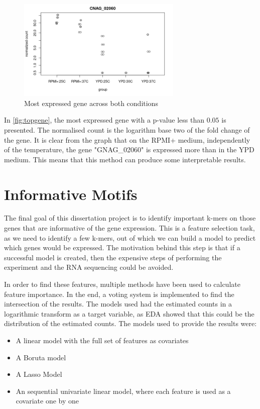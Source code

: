 \documentclass[11pt,twoside]{article}
\numberwithin{Theorem}{section}
\numberwithin{Definition}{section}
\numberwithin{Lemma}{section}
\numberwithin{Algorithm}{section}
\numberwithin{equation}{section}
\begin{document}
\vspace*{1em}
\begin{figure}[!h]
\centering
\includegraphics[width=0.7\textwidth]{./output/most-expressed-gene.pdf}
\caption{Most expressed gene across both conditions}
\label{fig:topgene}
\end{figure}
\vspace{2em}

In \autoref{fig:topgene}, the most expressed gene with a p-value less than $0.05$ is presented. The normalised count is the logarithm base two of the fold change of the gene. It is clear from the graph that on the RPMI+ medium, independently of the temperature, the gene "GNAG\_02060" is expressed more than in the YPD medium. This means that this method can produce some interpretable results.

\clearpage
\section{Informative Motifs}
\label{sec:diff}

The final goal of this dissertation project is to identify important k-mers on those genes that are informative of the gene expression. This is a feature selection task, as we need to identify a few k-mers, out of which we can build a model to predict which genes would be expressed. The motivation behind this step is that if a successful model is created, then the expensive steps of performing the experiment and the RNA sequencing could be avoided.

In order to find these features, multiple methods have been used to calculate feature importance. In the end, a voting system is implemented to find the intersection of the results. The models used had the estimated counts in a logarithmic transform as a target variable, as EDA showed that this could be the distribution of the estimated counts. The models used to provide the results were:
\begin{itemize}
\item A linear model with the full set of features as covariates
\item A Boruta model
\item A Lasso Model 
\item An sequential univariate linear model, where each feature is used as a covariate one by one
\end{itemize}
\end{document}
